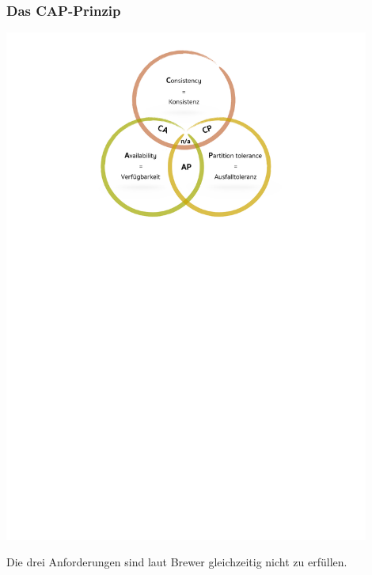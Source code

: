 \documentclass{beamer} %
\begin{document}
\begin{frame}
\frametitle{Das CAP-Prinzip}
\begin{center}
\includegraphics[trim = 0mm 189mm 0mm 9mm, clip, width=0.9\textwidth]{img/myPictureForCAP}
\end{center}
Die drei Anforderungen sind laut Brewer gleichzeitig nicht zu erfüllen.
\end{frame}
\end{document}
